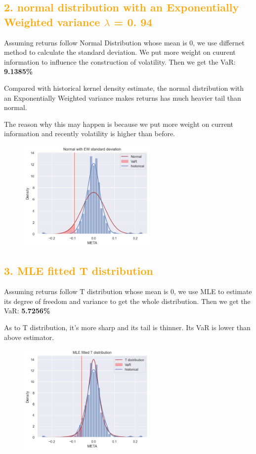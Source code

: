 \documentclass[11pt,en]{elegantpaper}
\begin{document}
\subsection*{\textcolor{orange}{2. normal distribution with an Exponentially Weighted variance $\lambda$ = 0. 94}}

Assuming returns follow Normal Distribution whose mean is 0, we use differnet method to calculate the standard deviation. We put more weight on cuurent information to influence the construction of volatility. Then we get the VaR: \textbf{9.1385\%}

Compared with historical kernel density estimate, the normal distribution with an Exponentially Weighted variance makes returns has much heavier tail than normal. 

The reason why this may happen is because we put more weight on current information and recently volatility is higher than before.

\begin{figure}[htbp] 
    \centering 
    \includegraphics[width=0.6\textwidth]{./image/EWMA.png} 
\end{figure}

\subsection*{\textcolor{orange}{3. MLE fitted T distribution}}

Assuming returns follow T distribution whose mean is 0, we use MLE to estimate its degree of freedom and variance to get the whole distribution.  Then we get the VaR: \textbf{5.7256\%}

As to T distribution, it's more sharp and its tail is thinner. Its VaR is lower than above estimator.

\begin{figure}[htbp] 
    \centering 
    \includegraphics[width=0.6\textwidth]{./image/T.png} 
\end{figure}
\end{document}
